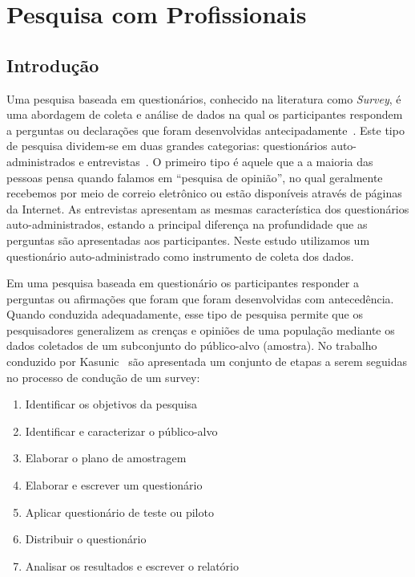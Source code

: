 \chapter{Pesquisa com Profissionais}
\label{ch:pesquisa-profissionais}

\section{Introdução}
\label{sec:pesquisa-profissionais-intro}

Uma pesquisa baseada em questionários, conhecido na literatura como
\textit{Survey}, é uma abordagem de coleta e análise de dados na qual os
participantes respondem a perguntas ou declarações que foram desenvolvidas
antecipadamente~\cite{kasunic2005designing}. Este tipo de pesquisa
dividem-se em duas grandes categorias: questionários auto-administrados e
entrevistas~\cite{kasunic2005designing}. O primeiro tipo é aquele que a a
maioria das pessoas pensa quando falamos em  ``pesquisa de opinião'', no qual
geralmente recebemos por meio de correio eletrônico ou estão disponíveis através
de páginas da Internet. As entrevistas apresentam as mesmas característica dos
questionários auto-administrados, estando a principal diferença na profundidade
que as perguntas são apresentadas aos participantes.  Neste estudo utilizamos
um questionário auto-administrado como instrumento de coleta dos dados.

Em uma pesquisa baseada em questionário os participantes responder a perguntas
ou afirmações que foram que foram desenvolvidas com antecedência. Quando
conduzida adequadamente, esse tipo de pesquisa permite que os pesquisadores
generalizem as crenças e opiniões de uma população mediante os dados
coletados de um subconjunto do público-alvo (amostra). No trabalho conduzido por
Kasunic~\cite{kasunic2005designing} são apresentada um conjunto de etapas a
serem seguidas no processo de condução de um survey:

\begin{enumerate}
\item{Identificar os objetivos da pesquisa}
\item{Identificar e caracterizar o público-alvo}
\item{Elaborar o plano de amostragem}
\item{Elaborar e escrever um questionário}
\item{Aplicar questionário de teste ou piloto}
\item{Distribuir o questionário}
\item{Analisar os resultados e escrever o relatório}
\end{enumerate}


